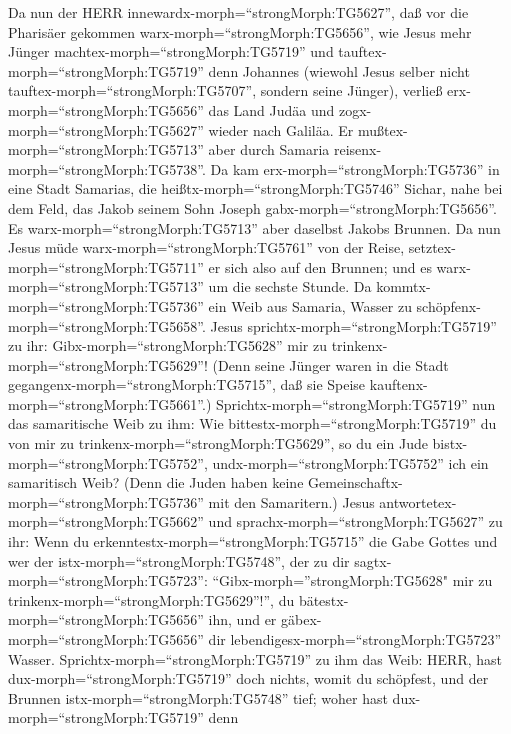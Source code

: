  Da nun der HERR innewardx-morph=``strongMorph:TG5627'', daß
vor die Pharisäer gekommen warx-morph=``strongMorph:TG5656'', wie Jesus
mehr Jünger machtex-morph=``strongMorph:TG5719'' und
tauftex-morph=``strongMorph:TG5719'' denn Johannes  (wiewohl
Jesus selber nicht tauftex-morph=``strongMorph:TG5707'', sondern seine
Jünger),  verließ erx-morph=``strongMorph:TG5656'' das Land
Judäa und zogx-morph=``strongMorph:TG5627'' wieder nach Galiläa.
 Er mußtex-morph=``strongMorph:TG5713'' aber durch Samaria
reisenx-morph=``strongMorph:TG5738''.  Da kam
erx-morph=``strongMorph:TG5736'' in eine Stadt Samarias, die
heißtx-morph=``strongMorph:TG5746'' Sichar, nahe bei dem Feld, das Jakob
seinem Sohn Joseph gabx-morph=``strongMorph:TG5656''.  Es
warx-morph=``strongMorph:TG5713'' aber daselbst Jakobs Brunnen. Da nun
Jesus müde warx-morph=``strongMorph:TG5761'' von der Reise,
setztex-morph=``strongMorph:TG5711'' er sich also auf den Brunnen; und
es warx-morph=``strongMorph:TG5713'' um die sechste Stunde. 
Da kommtx-morph=``strongMorph:TG5736'' ein Weib aus Samaria, Wasser zu
schöpfenx-morph=``strongMorph:TG5658''. Jesus
sprichtx-morph=``strongMorph:TG5719'' zu ihr:
Gibx-morph=``strongMorph:TG5628'' mir zu
trinkenx-morph=``strongMorph:TG5629''!  (Denn seine Jünger
waren in die Stadt gegangenx-morph=``strongMorph:TG5715'', daß sie
Speise kauftenx-morph=``strongMorph:TG5661''.) 
Sprichtx-morph=``strongMorph:TG5719'' nun das samaritische Weib zu ihm:
Wie bittestx-morph=``strongMorph:TG5719'' du von mir zu
trinkenx-morph=``strongMorph:TG5629'', so du ein Jude
bistx-morph=``strongMorph:TG5752'', undx-morph=``strongMorph:TG5752''
ich ein samaritisch Weib? (Denn die Juden haben keine
Gemeinschaftx-morph=``strongMorph:TG5736'' mit den Samaritern.)
 Jesus antwortetex-morph=``strongMorph:TG5662'' und
sprachx-morph=``strongMorph:TG5627'' zu ihr: Wenn du
erkenntestx-morph=``strongMorph:TG5715'' die Gabe Gottes und wer der
istx-morph=``strongMorph:TG5748'', der zu dir
sagtx-morph=``strongMorph:TG5723'': ``Gibx-morph=''strongMorph:TG5628"
mir zu trinkenx-morph=``strongMorph:TG5629''!'', du
bätestx-morph=``strongMorph:TG5656'' ihn, und er
gäbex-morph=``strongMorph:TG5656'' dir
lebendigesx-morph=``strongMorph:TG5723'' Wasser. 
Sprichtx-morph=``strongMorph:TG5719'' zu ihm das Weib: HERR, hast
dux-morph=``strongMorph:TG5719'' doch nichts, womit du schöpfest, und
der Brunnen istx-morph=``strongMorph:TG5748'' tief; woher hast
dux-morph=``strongMorph:TG5719'' denn
